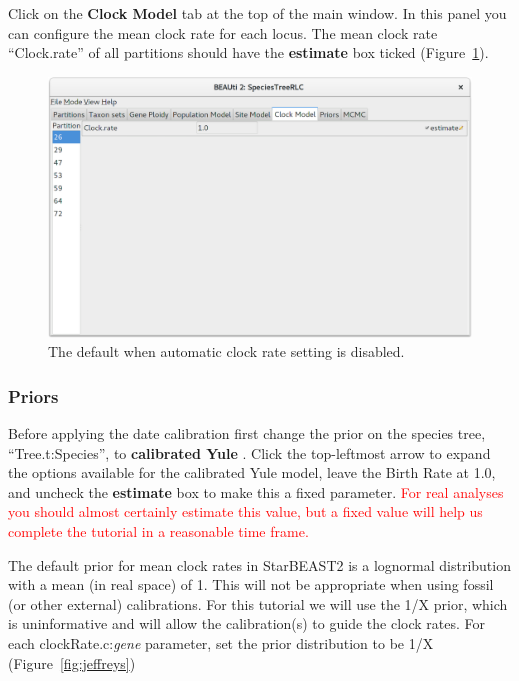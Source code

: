 \documentclass{article}
\begin{document}
Click on the \textbf{Clock Model} tab at the top of the main window. In this
panel you can configure the mean clock rate for each locus. The
mean clock rate ``Clock.rate'' of all partitions should have the
\textbf{estimate} box ticked (Figure~\ref{fig:clock}).

\begin{figure}[htb!]
\centering
\includegraphics[width=\textwidth]{figures/beauti-clock.png}
\caption{The default when automatic clock rate setting is disabled.}
\label{fig:clock}
\end{figure}

\clearpage

\subsubsection*{Priors}

Before applying the date calibration first change the prior on the species
tree, ``Tree.t:Species'', to \textbf{calibrated Yule} \citep{Heled01012012}.
Click the top-leftmost arrow to expand the options available for the
calibrated Yule model, leave the Birth Rate at 1.0, and uncheck the
\textbf{estimate} box to make this a fixed parameter. \textcolor{red}{For real
analyses you should almost certainly estimate this value, but a fixed value
will help us complete the tutorial in a reasonable time frame.}

The default prior for mean clock rates in StarBEAST2 is a lognormal
distribution with a mean (in real space) of 1. This will not be appropriate
when using fossil (or other external) calibrations. For this tutorial we will
use the 1/X prior, which is uninformative and will allow the calibration(s) to
guide the clock rates. For each clockRate.c:\textit{gene} parameter, set
the prior distribution to be 1/X (Figure~\ref{fig:jeffreys})
\end{document}
